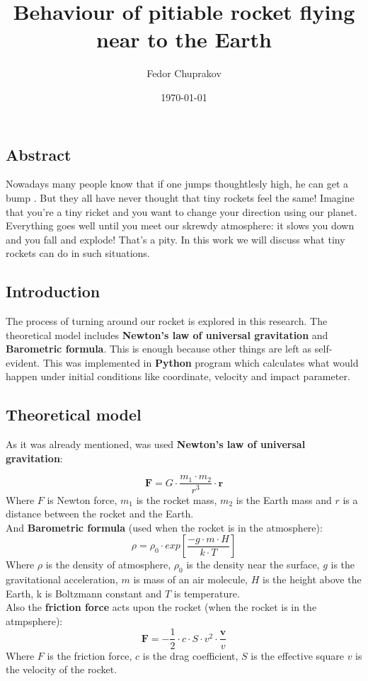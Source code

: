 \documentclass[a4paper,12pt]{article}
\author{Fedor Chuprakov}
\title{Behaviour of pitiable rocket flying near to the Earth}
\date{\today}
\begin{document}
\maketitle
\newpage
\subsection*{Abstract}
Nowadays many people know that if one jumps thoughtlesly high, he can get a bump
. But they all have never thought that tiny rockets feel the same! Imagine that
you're a tiny ricket and you want to change your direction using our planet.
Everything goes well until you meet our skrewdy atmosphere: it slows you down and you fall and explode! That's a pity. In this work we will discuss what tiny rockets can do in such situations.
\subsection*{Introduction}
The process of turning around our rocket is explored in this research.
The theoretical model includes \textbf{Newton's law of universal gravitation
} and \textbf{Barometric formula}. This is enough because other things are left as self-evident. This was implemented in \textbf{Python} program which calculates what would happen under initial conditions like coordinate, velocity and impact parameter.
\subsection*{Theoretical model}
As it was already mentioned, was used \textbf{Newton's law of universal gravitation}:

\begin{equation}\label{Newton}
	\textbf{F}=G\cdot \frac{m_1\cdot m_2}{r^3} \cdot \textbf{r}
\end{equation}
Where \textit{$F$} is Newton force, \textit{$m_1$} is the rocket mass, \textit{$m_2$} is the Earth mass and \textit{$r$} is a distance between the rocket and the Earth.\\
And \textbf{Barometric formula} (used when the rocket is in the atmosphere):
\begin{equation}\label{Barometric}
	\rho = \rho_0 \cdot exp \left[ \frac{-g \cdot m \cdot H}{k \cdot T} \right]
\end{equation}
Where \textit{$\rho$} is the density of atmosphere, \textit{$\rho_0$} is the density near the surface, \textit{$g$} is the gravitational acceleration, \textit{$m$} is mass of an air molecule, \textit{$H$} is the height above the Earth, k is Boltzmann constant and \textit{$T$} is temperature.\\
Also the \textbf{friction force} acts upon the rocket (when the rocket is in the atmpsphere):
\begin{equation}\label{Resistance}
	\textbf{F} = -\frac{1}{2} \cdot c \cdot S \cdot v^2 \cdot \frac{\textbf{v}}{v}
\end{equation}
Where \textit{$F$} is the friction force, \textit{$c$} is the drag coefficient, \textit{$S$} is the effective square \textit{$v$} is the velocity of the rocket.
\end{document}
